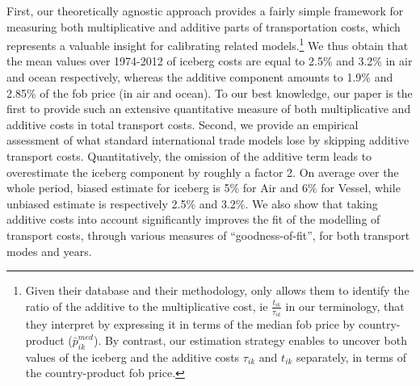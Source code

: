 \documentclass[a4paper,11pt]{article}
\begin{document}
First, our theoretically agnostic approach provides a fairly simple framework for measuring both multiplicative and additive parts of transportation costs, which represents a valuable insight for calibrating related models.\footnote{Given their database and their methodology, \citet{Irrazabal_2015} only allows them to identify the ratio of the additive to the multiplicative cost, ie $\frac{t_{ik}}{\tau_{ik}}$ in our terminology, that they interpret by expressing it in terms of the median fob price by country-product ($\bar{p}^{med}_{ik}$). By contrast, our estimation strategy enables to uncover both values of the iceberg and the additive costs $\tau_{ik}$ and $t_{ik}$ separately, in terms of the country-product fob price.} We thus obtain that the mean values over 1974-2012 of iceberg costs are equal to 2.5\% and 3.2\% in air and ocean respectively, whereas the additive component amounts to 1.9\% and 2.85\% of the fob price (in air and ocean). To our best knowledge, our paper is the first to provide such an extensive quantitative measure of both multiplicative and additive costs in total transport costs. Second, we provide an empirical assessment of what standard international trade models lose by skipping additive transport costs. Quantitatively, the omission of the additive term leads to overestimate the iceberg component by roughly a factor 2. On average over the whole period, biased estimate for iceberg is 5\% for Air and 6\% for Vessel, while unbiased estimate is respectively 2.5\% and 3.2\%. We also show that taking additive costs into account significantly improves the fit of the modelling of transport costs, through various measures of ``goodness-of-fit'', for both transport modes and years. 
\end{document}
